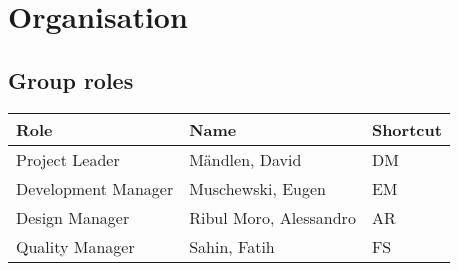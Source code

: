 \chapter{Organisation}
\section{Group roles}
\begin{table}[h]
	\begin{tabularx}{\textwidth}{XXX}
		Role & Name & Shortcut\\
		\toprule
		Project Leader & Mändlen, David & DM\\
		Development Manager & Muschewski, Eugen & EM\\
		Design Manager & Ribul Moro, Alessandro & AR\\
		Quality Manager & Sahin, Fatih & FS
	\end{tabularx}
\end{table}
